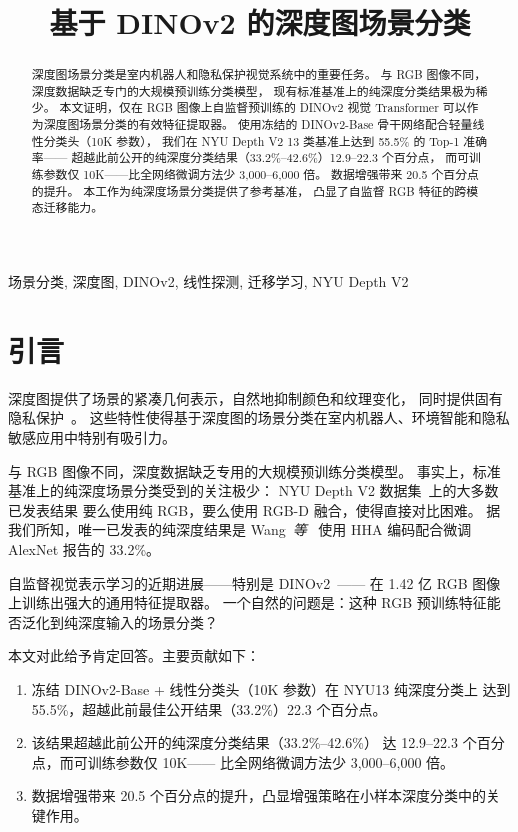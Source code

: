 \documentclass[conference, a4paper]{IEEEtran}
\title{基于 DINOv2 的深度图场景分类}
\author{
    \IEEEauthorblockN{丁驿}
    \IEEEauthorblockA{武汉理工大学国际教育学院 \\
        Email: dyvertin@outlook.com
    }
}
\begin{document}
\maketitle

\begin{abstract}
深度图场景分类是室内机器人和隐私保护视觉系统中的重要任务。
与 RGB 图像不同，深度数据缺乏专门的大规模预训练分类模型，
现有标准基准上的纯深度分类结果极为稀少。
本文证明，仅在 RGB 图像上自监督预训练的 DINOv2 视觉 Transformer
可以作为深度图场景分类的有效特征提取器。
使用冻结的 DINOv2-Base 骨干网络配合轻量线性分类头（10K 参数），
我们在 NYU Depth V2 13 类基准上达到 55.5\% 的 Top-1 准确率——
超越此前公开的纯深度分类结果（33.2\%--42.6\%）12.9--22.3 个百分点，
而可训练参数仅 10K——比全网络微调方法少 3,000--6,000 倍。
数据增强带来 20.5 个百分点的提升。
本工作为纯深度场景分类提供了参考基准，
凸显了自监督 RGB 特征的跨模态迁移能力。
\end{abstract}

\begin{IEEEkeywords}
场景分类, 深度图, DINOv2, 线性探测, 迁移学习, NYU Depth V2
\end{IEEEkeywords}

\section{引言}

深度图提供了场景的紧凑几何表示，自然地抑制颜色和纹理变化，
同时提供固有隐私保护~\cite{robotics_depth}。
这些特性使得基于深度图的场景分类在室内机器人、环境智能和隐私敏感应用中特别有吸引力。

与 RGB 图像不同，深度数据缺乏专用的大规模预训练分类模型。
事实上，标准基准上的纯深度场景分类受到的关注极少：
NYU Depth V2 数据集~\cite{nyu_depth}上的大多数已发表结果
要么使用纯 RGB，要么使用 RGB-D 融合，使得直接对比困难。
据我们所知，唯一已发表的纯深度结果是 Wang~\textit{等}~\cite{wang3d}
使用 HHA 编码配合微调 AlexNet 报告的 33.2\%。

自监督视觉表示学习的近期进展——特别是 DINOv2~\cite{dinov2}——
在 1.42 亿 RGB 图像上训练出强大的通用特征提取器。
一个自然的问题是：这种 RGB 预训练特征能否泛化到纯深度输入的场景分类？

本文对此给予肯定回答。主要贡献如下：

\begin{enumerate}
    \item 冻结 DINOv2-Base + 线性分类头（10K 参数）在 NYU13 纯深度分类上
          达到 55.5\%，超越此前最佳公开结果（33.2\%）22.3 个百分点。
    \item 该结果超越此前公开的纯深度分类结果（33.2\%--42.6\%）
          达 12.9--22.3 个百分点，而可训练参数仅 10K——
          比全网络微调方法少 3,000--6,000 倍。
    \item 数据增强带来 20.5 个百分点的提升，凸显增强策略在小样本深度分类中的关键作用。
\end{enumerate}
\end{document}
